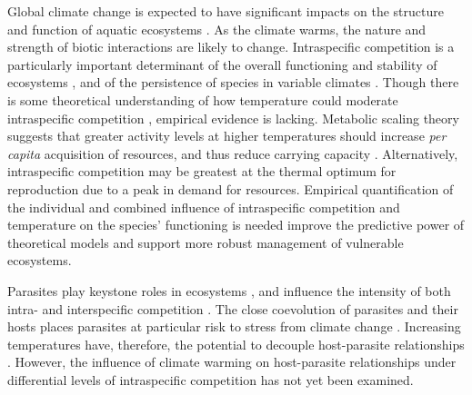 Global climate change is expected to have significant impacts on the structure and function of aquatic ecosystems \citep{carpenter2011, ogorman2012}. As the climate warms, the nature and strength of biotic interactions are likely to change. Intraspecific competition is a particularly important determinant of  the overall functioning and stability of ecosystems \citep{barabas2016}, and of the persistence of species in variable climates \citep{pilfold2014, stenseth2015}. Though there is some theoretical understanding of how temperature could moderate intraspecific competition \citep{amarasekare2015}, empirical evidence is lacking. Metabolic scaling theory suggests that greater activity levels at higher temperatures should increase \emph{per capita} acquisition of resources, and thus reduce carrying capacity \citep{savage2004}. Alternatively, intraspecific competition may be greatest at the thermal optimum for reproduction due to a peak in demand for resources. Empirical quantification of the individual and combined influence of intraspecific competition and temperature on the species' functioning is needed improve the predictive power of theoretical models and support more robust management of vulnerable ecosystems. 

Parasites play keystone roles in ecosystems \citep{hatcher2008}, and influence the intensity of both intra- and interspecific competition \citep{yan1995, macneil2003}. The close coevolution of parasites and their hosts places parasites at particular risk to stress from climate change \citep{carlson2017}. Increasing temperatures have, therefore, the potential to decouple host-parasite relationships \citep{goedknegt2015, strepparava2017}. However, the influence of climate warming on host-parasite relationships under differential levels of intraspecific competition has not yet been examined. 


